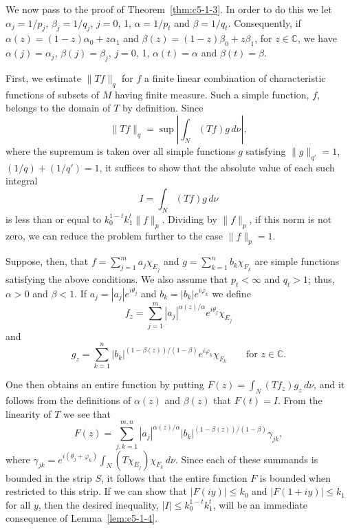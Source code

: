 We now pass to the proof of Theorem~\ref{thm:c5-1-3}. In order to do this we
let $\alpha_{j} = 1/p_{j}$, $\beta_{j} = 1/q_{j}$, $j = 0$, 1,
$\alpha = 1/p_{t}$ and $\beta = 1/q_{t}$. Consequently, if
$\alpha(z) = (1 - z)\alpha_{0} + z\alpha_{1}$ and
$\beta(z) = (1 - z)\beta_{0} + z\beta_{1}$, for $z \in \mathbb{C}$, we have
$\alpha(j) = \alpha_{j}$, $\beta(j) = \beta_{j}$, $j = 0$, 1, $\alpha(t) = \alpha$
and $\beta(t) = \beta$.

First, we estimate $\|Tf\|_{q}$ for $f$ a finite linear combination of
characteristic functions of subsets of $M$ having finite measure. Such a simple
function, $f$, belongs to the domain of $T$ by definition. Since
\[
\|Tf\|_{q}=\sup\left|\int_{N}(Tf)g\,d\nu\right|,
\]
where the supremum is taken over all simple functions $g$ satisfying
$\|g\|_{q'} = 1$, $(1/q) + (1/q') = 1$, it suffices to show that the absolute
value of each such integral
\[
I=\int_{N}(Tf)g\,d\nu
\]
is less than or equal to $k_{0}^{1-t}k_{1}^{t}\|f\|_{p}$. Dividing by
$\|f\|_{p}$, if this norm is not zero, we can reduce the problem further to the
case $\|f\|_{p} = 1$.

Suppose, then, that $f = \sum_{j=1}^{m}a_{j}\chi_{E_{j}}$ and
$g = \sum_{k=1}^{n}b_{k}\chi_{F_{k}}$ are simple functions satisfying the above
conditions. We also assume that $p_{t} < \infty$ and $q_{t} > 1$; thus,
$\alpha > 0$ and $\beta < 1$. If $a_{j} = |a_{j}|e^{i\theta_{j}}$ and
$b_{k} = |b_{k}|e^{i\varphi_{k}}$ we define
\[
f_{z}=\sum_{j=1}^{m}|a_{j}|^{\alpha(z)/\alpha}e^{i\theta_{j}}\chi_{E_{j}}
\]
and
\[
g_{z}=\sum_{k=1}^{n}|b_{k}|^{(1-\beta(z))/(1-\beta)}e^{i\varphi_{k}}\chi_{F_{k}}
\qquad\text{for } z \in \mathbb{C}.
\]

One then obtains an entire function by putting
$F(z) = \int_{N}(Tf_{z})g_{z}\,d\nu$, and it follows from the definitions of
$\alpha(z)$ and $\beta(z)$ that $F(t) = I$. From the linearity of $T$ we see
that
\[
F(z)=\sum_{j,k=1}^{m,n}|a_{j}|^{\alpha(z)/\alpha}|b_{k}|^{(1-\beta(z))/(1-\beta)}\gamma_{jk},
\]
where
$\gamma_{jk} = e^{i(\theta_{j} + \varphi_{k})}\int_{N}(T\chi_{E_{j}})\chi_{F_{k}}\,d\nu$.
Since each of these summands is bounded in the strip $S$, it follows that the
entire function $F$ is bounded when restricted to this strip. If we can show
that $|F(iy)| \leq k_{0}$ and $|F(1 + iy)| \leq k_{1}$ for all $y$, then the
desired inequality, $|I| \leq k_{0}^{1-t}k_{1}^{t}$, will be an immediate
consequence of Lemma~\ref{lem:c5-1-4}.

